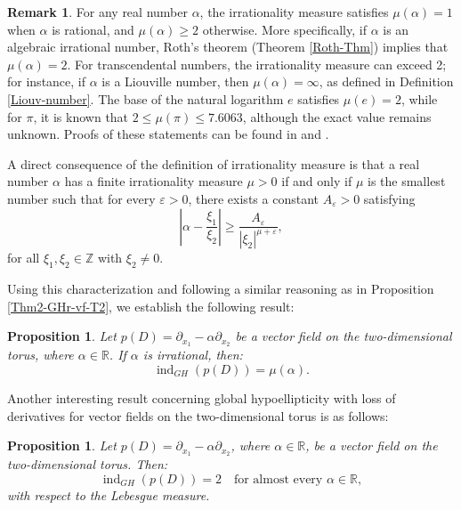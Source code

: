 \documentclass[11pt]{amsart}
\numberwithin{equation}{section}
\newtheorem{proposition}[theorem]{Proposition}
\theoremstyle{definition}
\newtheorem{remark}[theorem]{Remark}
\begin{document}
	\begin{remark}\label{measure-remark}
		For any real number \( \alpha \), the irrationality measure satisfies \( \mu(\alpha) = 1 \) when \( \alpha \) is rational, and \( \mu(\alpha) \geq 2 \) otherwise. More specifically, if \( \alpha \) is an algebraic irrational number, Roth's theorem (Theorem \ref{Roth-Thm}) implies that \( \mu(\alpha) = 2 \). For transcendental numbers, the irrationality measure can exceed 2; for instance, if \( \alpha \) is a Liouville number, then \( \mu(\alpha) = \infty \), as defined in Definition \ref{Liouv-number}. The base of the natural logarithm \( e \) satisfies \( \mu(e) = 2 \), while for \( \pi \), it is known that \( 2 \leq \mu(\pi) \leq 7.6063 \), although the exact value remains unknown. Proofs of these statements can be found in \cite{Bugeaud_2012} and \cite{pi}.
	\end{remark}
	
	A direct consequence of the definition of irrationality measure is that a real number \( \alpha \) has a finite irrationality measure \( \mu > 0 \) if and only if \( \mu \) is the smallest number such that for every \( \varepsilon > 0 \), there exists a constant \( A_\varepsilon > 0 \) satisfying
	\begin{equation*}
		\left| \alpha - \frac{\xi_1}{\xi_2} \right| \geq \frac{A_\varepsilon}{|\xi_2|^{\mu + \varepsilon}},
	\end{equation*}
	for all \( \xi_1, \xi_2 \in \mathbb{Z} \) with \( \xi_2 \neq 0 \).
	
	Using this characterization and following a similar reasoning as in Proposition \ref{Thm2-GHr-vf-T2}, we establish the following result:
	
	\begin{proposition}\label{Thm-irrational-measure}
		Let \( p(D) = \partial_{x_1} - \alpha \partial_{x_2} \) be a vector field on the two-dimensional torus, where \( \alpha \in \mathbb{R} \). If \( \alpha \) is irrational, then:
		\[
		\operatorname{ind}_{GH}(p(D)) = \mu(\alpha).
		\]
	\end{proposition}
	
	Another interesting result concerning global hypoellipticity with loss of derivatives for vector fields on the two-dimensional torus is as follows:
	
	\begin{proposition}\label{Lebesgue-measure}
		Let \( p(D) = \partial_{x_1} - \alpha \partial_{x_2} \), where \( \alpha \in \mathbb{R} \), be a vector field on the two-dimensional torus. Then:
		\[
		\operatorname{ind}_{GH}(p(D)) = 2 \quad \text{for almost every } \alpha \in \mathbb{R},
		\]
		with respect to the Lebesgue measure.
	\end{proposition}
		
\end{document}
